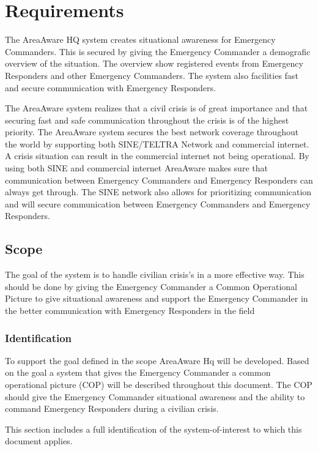 \label{chp_requirements}
\chapter{Requirements}
The AreaAware HQ system creates situational awareness for Emergency Commanders. This is secured by giving the Emergency Commander a demografic overview of the situation. The overview show registered events from Emergency Responders and other Emergency Commanders. The system also facilities fast and secure communication with Emergency Responders.

The AreaAware system realizes that a civil crisis is of great importance and that securing fast and safe communication throughout the crisis is of the highest priority. The AreaAware system secures the best network coverage throughout the world by supporting both SINE/TELTRA Network and commercial internet. A crisis situation can result in the commercial internet not being operational. By using both SINE and commercial internet AreaAware makes sure that communication between Emergency Commanders and Emergency Responders can always get through. The SINE network also allows for prioritizing communication and will secure communication between Emergency Commanders and Emergency Responders.

\section{Scope}
The goal of the system is to handle civilian crisis's in a more effective way. This should be done by giving the Emergency Commander a Common Operational Picture to give situational awareness and support the Emergency Commander in the better communication with Emergency Responders in the field

\subsection{Identification}
To support the goal defined in the scope AreaAware Hq will be developed. Based on the goal a system that gives the Emergency Commander a common operational picture (COP) will be described throughout this document. The COP should give the Emergency Commander situational awareness and the ability to command Emergency Responders during a civilian crisis. 

This section includes a full identification of the system-of-interest to which this document applies.


